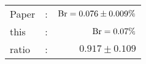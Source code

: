       \begin{tabular}{lcr}
          Paper &:& $\mathrm{Br}  = 0.076\pm 0.009\%$ \\
          this      &:& $\mathrm{Br}  = 0.07\%$ \\
		  ratio   &:& $0.917\pm 0.109$ \\
      \end{tabular}
